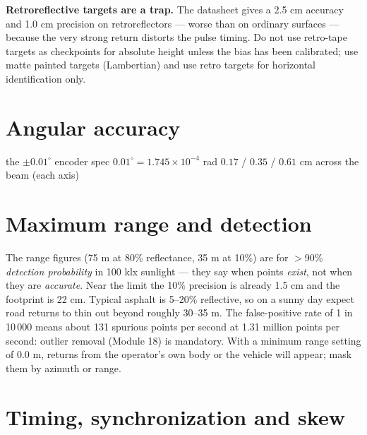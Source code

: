 \begin{tip}
\textbf{Retroreflective targets are a trap.} The datasheet gives a 2.5 cm accuracy and 1.0 cm precision on retroreflectors --- worse than on ordinary surfaces --- because the very strong return distorts the pulse timing. Do not use retro-tape targets as checkpoints for absolute height unless the bias has been calibrated; use matte painted targets (Lambertian) and use retro targets for horizontal identification only.
\end{tip}

\section{Angular accuracy}
\begin{worked}{the $\pm0.01^\circ$ encoder spec}
 $0.01^\circ=1.745\times10^{-4}$ rad
 $0.17$ / $0.35$ / $0.61$ cm across the beam (each axis)
\end{worked}

\section{Maximum range and detection}
\begin{eng}
The range figures (75 m at 80\% reflectance, 35 m at 10\%) are for $>$90\% \emph{detection probability} in 100 klx sunlight --- they say when points \emph{exist}, not when they are \emph{accurate}. Near the limit the 10\% precision is already 1.5 cm and the footprint is 22 cm. Typical asphalt is 5--20\% reflective, so on a sunny day expect road returns to thin out beyond roughly 30--35 m. The false-positive rate of 1 in 10\,000 means about 131 spurious points per second at 1.31 million points per second: outlier removal (Module 18) is mandatory. With a minimum range setting of 0.0 m, returns from the operator's own body or the vehicle will appear; mask them by azimuth or range.
\end{eng}

\section{Timing, synchronization and skew}

